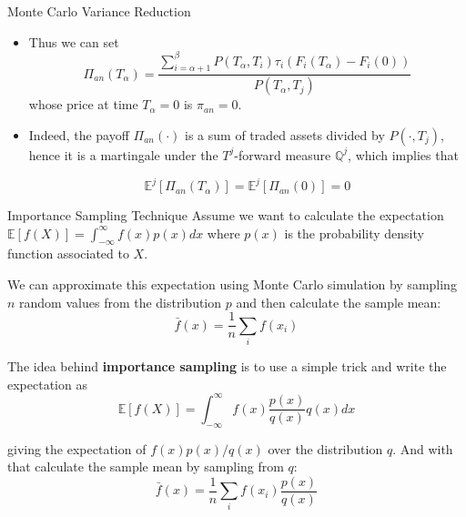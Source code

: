 \documentclass{beamer}
\begin{document}
\begin{frame}{Monte Carlo Variance Reduction}
  \begin{itemize}
  \item<1-> Thus we can set
    \begin{equation*}
      \Pi_{an}(T_\alpha) = \frac{\sum_{i=\alpha+1}^\beta P(T_\alpha,T_i)\tau_i(F_i(T_\alpha) - F_i(0))}{P(T_\alpha,T_j)}
    \end{equation*}
    whose price at time $T_\alpha = 0$ is $\pi_{an} = 0$.
  \item<2-> Indeed, the payoff $\Pi_{an}(\cdot)$ is a sum of traded assets divided by $P(\cdot, T_j)$, hence it is a martingale under the $T^j$-forward measure $\mathbb{Q}^j$, which implies that
    
    \begin{equation*}
      \mathbb{E}^j[\Pi_{an}(T_\alpha)] = \mathbb{E}^j[\Pi_{an}(0)] = 0
    \end{equation*}
  \end{itemize}
\end{frame}

\begin{frame}{Importance Sampling Technique}
Assume we want to calculate the expectation $\mathbb{E}[f(X)]=\int_{-\infty}^\infty f(x)p(x)dx$
where $p(x)$ is the probability density function associated to $X$.

We can approximate this expectation using Monte Carlo simulation by sampling $n$ random values from the distribution $p$ and then calculate the sample mean:
\begin{equation*}
\bar{f}(x) = \frac{1}{n}\sum_i f(x_i)	
\end{equation*}

The idea behind \textbf{importance sampling} is to use a simple trick and write the expectation as
\begin{equation*}
\mathbb{E}[f(X)] = \int_{-\infty}^\infty f(x)\frac{p(x)}{q(x)}q(x)dx
\end{equation*}

giving the expectation of $f(x)p(x)/q(x)$ over the distribution $q$.
And with that calculate the sample mean by sampling from $q$:
\begin{equation*}
\bar{f}(x) = \frac{1}{n}\sum_i f(x_i)\frac{p(x)}{q(x)}
\end{equation*}
\end{frame}
\end{document}
